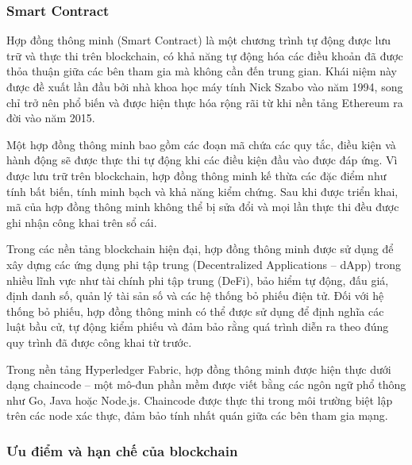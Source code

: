 \subsubsection{Smart Contract}

Hợp đồng thông minh (Smart Contract) là một chương trình tự động được lưu trữ và thực thi trên blockchain, có khả năng tự động hóa các điều khoản đã được thỏa thuận giữa các bên tham gia mà không cần đến trung gian. Khái niệm này được đề xuất lần đầu bởi nhà khoa học máy tính Nick Szabo vào năm 1994, song chỉ trở nên phổ biến và được hiện thực hóa rộng rãi từ khi nền tảng Ethereum ra đời vào năm 2015.

Một hợp đồng thông minh bao gồm các đoạn mã chứa các quy tắc, điều kiện và hành động sẽ được thực thi tự động khi các điều kiện đầu vào được đáp ứng. Vì được lưu trữ trên blockchain, hợp đồng thông minh kế thừa các đặc điểm như tính bất biến, tính minh bạch và khả năng kiểm chứng. Sau khi được triển khai, mã của hợp đồng thông minh không thể bị sửa đổi và mọi lần thực thi đều được ghi nhận công khai trên sổ cái.

Trong các nền tảng blockchain hiện đại, hợp đồng thông minh được sử dụng để xây dựng các ứng dụng phi tập trung (Decentralized Applications -- dApp) trong nhiều lĩnh vực như tài chính phi tập trung (DeFi), bảo hiểm tự động, đấu giá, định danh số, quản lý tài sản số và các hệ thống bỏ phiếu điện tử. Đối với hệ thống bỏ phiếu, hợp đồng thông minh có thể được sử dụng để định nghĩa các luật bầu cử, tự động kiểm phiếu và đảm bảo rằng quá trình diễn ra theo đúng quy trình đã được công khai từ trước.

Trong nền tảng Hyperledger Fabric, hợp đồng thông minh được hiện thực dưới dạng chaincode -- một mô-đun phần mềm được viết bằng các ngôn ngữ phổ thông như Go, Java hoặc Node.js. Chaincode được thực thi trong môi trường biệt lập trên các node xác thực, đảm bảo tính nhất quán giữa các bên tham gia mạng.

\subsubsection{Ưu điểm và hạn chế của blockchain}

